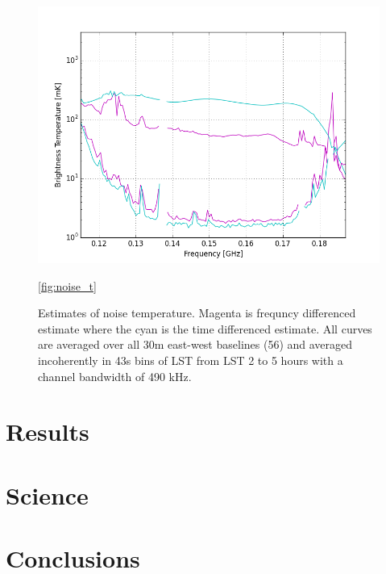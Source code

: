 \documentclass[twocolumn,numberedappendix]{emulateapj}
\begin{document}
\begin{figure}[h!]\centering
\includegraphics[width=\columnwidth, height=.8\columnwidth]{plots/noise_t.png}
\caption{Estimates of noise temperature. Magenta is frequncy differenced
estimate where the cyan is the time differenced estimate. All curves are
averaged over all 30m east-west baselines (56) and averaged incoherently in 43s
bins of LST from LST 2 to 5 hours with a channel bandwidth of 490 kHz.}
\ref{fig:noise_t}
\end{figure}


% 


\section{Results}

\section{Science}

\section{Conclusions}


%
%
\end{document}
